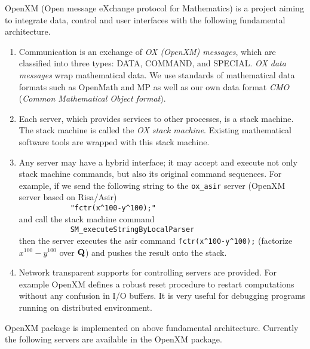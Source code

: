 
OpenXM (Open message eXchange protocol for Mathematics)
is a project aiming to integrate data, control and user interfaces
with the following fundamental architecture.
\begin{enumerate}
\item Communication is an exchange of {\it OX (OpenXM) messages},
which are classified into three types:
DATA, COMMAND, and SPECIAL.
{\it OX data messages} wrap mathematical data.
We use standards of mathematical data formats such as OpenMath and MP
as well as our own data format {\it CMO}
({\it Common Mathematical Object format}).
\item Each server, which provides services to other processes, is a stack machine. The stack machine is called the {\it OX stack machine}.
Existing mathematical software tools are wrapped with this stack machine.
\item Any server may have a hybrid interface;
it may accept and execute not only stack machine commands, 
but also its original command sequences.
For example,
if we send the following string to the {\tt ox\_asir} server 
(OpenXM server based on Risa/Asir)\\
\verb+            "fctr(x^100-y^100);"+\\
and call the stack machine command\\
\verb+            SM_executeStringByLocalParser+\\
then the server executes the asir command
\verb+fctr(x^100-y^100);+ 
(factorize $x^{100}-y^{100}$ over ${\bf Q}$)
and pushes the result onto the stack.
\item Network transparent supports for controlling servers are provided.
For example OpenXM defines a robust reset procedure to restart computations
without any confusion in I/O buffers.
It is very useful for debugging programs running on distributed environment.
\end{enumerate}
OpenXM package  is implemented on above fundamental architecture.
Currently the following servers are available in the OpenXM package.

